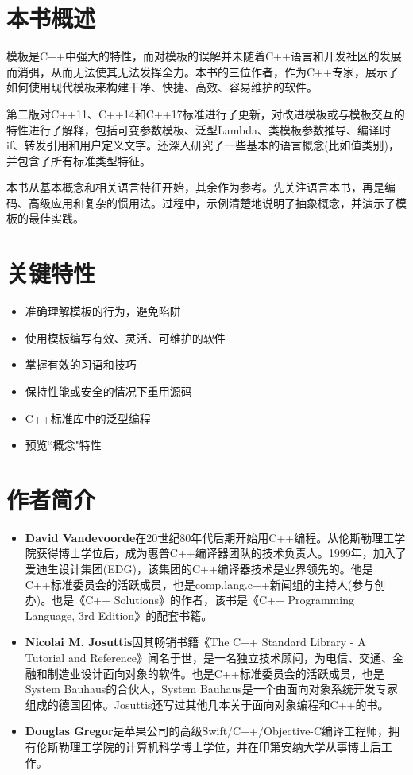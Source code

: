 \maketitle

\section{本书概述}

模板是C++中强大的特性，而对模板的误解并未随着C++语言和开发社区的发展而消弭，从而无法使其无法发挥全力。本书的三位作者，作为C++专家，展示了如何使用现代模板来构建干净、快捷、高效、容易维护的软件。

第二版对C++11、C++14和C++17标准进行了更新，对改进模板或与模板交互的特性进行了解释，包括可变参数模板、泛型Lambda、类模板参数推导、编译时if、转发引用和用户定义文字。还深入研究了一些基本的语言概念(比如值类别)，并包含了所有标准类型特征。

本书从基本概念和相关语言特征开始，其余作为参考。先关注语言本书，再是编码、高级应用和复杂的惯用法。过程中，示例清楚地说明了抽象概念，并演示了模板的最佳实践。

\section{关键特性}
\begin{itemize}
  \item 准确理解模板的行为，避免陷阱
  \item 使用模板编写有效、灵活、可维护的软件
  \item 掌握有效的习语和技巧
  \item 保持性能或安全的情况下重用源码
  \item C++标准库中的泛型编程
  \item 预览“概念"特性
\end{itemize}

\section{作者简介}

\begin{itemize}
  \item \textbf{David Vandevoorde}在20世纪80年代后期开始用C++编程。从伦斯勒理工学院获得博士学位后，成为惠普C++编译器团队的技术负责人。1999年，加入了爱迪生设计集团(EDG)，该集团的C++编译器技术是业界领先的。他是C++标准委员会的活跃成员，也是comp.lang.c++新闻组的主持人(参与创办)。也是《C++ Solutions》的作者，该书是《C++ Programming Language, 3rd Edition》的配套书籍。

  \item \textbf{Nicolai M. Josuttis}因其畅销书籍《The C++ Standard Library - A Tutorial and Reference》闻名于世，是一名独立技术顾问，为电信、交通、金融和制造业设计面向对象的软件。也是C++标准委员会的活跃成员，也是System Bauhaus的合伙人，System Bauhaus是一个由面向对象系统开发专家组成的德国团体。Josuttis还写过其他几本关于面向对象编程和C++的书。

  \item \textbf{Douglas Gregor}是苹果公司的高级Swift/C++/Objective-C编译工程师，拥有伦斯勒理工学院的计算机科学博士学位，并在印第安纳大学从事博士后工作。
\end{itemize}


